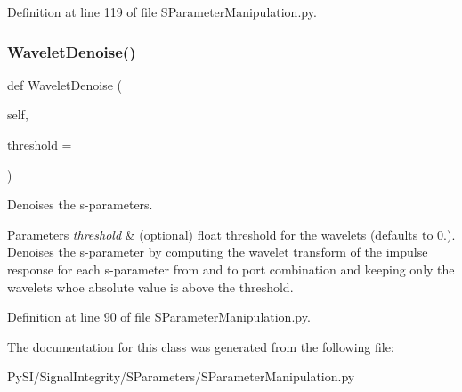 Definition at line 119 of file S\+Parameter\+Manipulation.\+py.

\mbox{\label{classSignalIntegrity_1_1SParameters_1_1SParameterManipulation_1_1SParameterManipulation_a537884def79fedd9611365a1de55471f}} 
\subsubsection{\texorpdfstring{Wavelet\+Denoise()}{WaveletDenoise()}}
{\footnotesize\ttfamily def Wavelet\+Denoise (\begin{DoxyParamCaption}\item[{}]{self,  }\item[{}]{threshold = {} }\end{DoxyParamCaption})}



Denoises the s-\/parameters. 


\begin{DoxyParams}{Parameters}
{\em threshold} & (optional) float threshold for the wavelets (defaults to 0.). Denoises the s-\/parameter by computing the wavelet transform of the impulse response for each s-\/parameter from and to port combination and keeping only the wavelets whoe absolute value is above the threshold. \\
\hline
\end{DoxyParams}


Definition at line 90 of file S\+Parameter\+Manipulation.\+py.



The documentation for this class was generated from the following file\+:\begin{DoxyCompactItemize}
\item 
Py\+S\+I/\+Signal\+Integrity/\+S\+Parameters/S\+Parameter\+Manipulation.\+py\end{DoxyCompactItemize}
